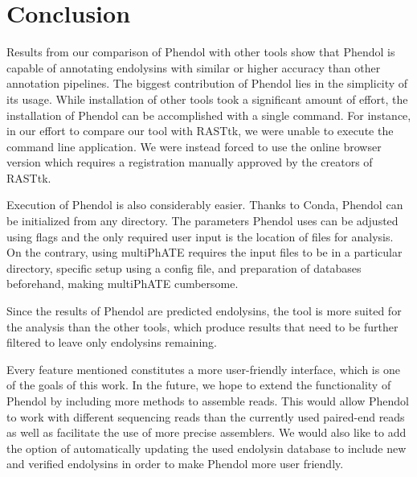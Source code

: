 \chapter*{Conclusion}  %

Results from our comparison of Phendol with other tools show that Phendol is capable of annotating endolysins with similar or higher accuracy than other annotation pipelines. The biggest contribution of Phendol lies in the simplicity of its usage. While installation of other tools took a significant amount of effort, the installation of Phendol can be accomplished with a single command. For instance, in our effort to compare our tool with RASTtk, we were unable to execute the command line application. We were instead forced to use the online browser version which requires a registration manually approved by the creators of RASTtk. 

Execution of Phendol is also considerably easier. Thanks to Conda, Phendol can be initialized from any directory. The parameters Phendol uses can be adjusted using flags and the only required user input is the location of files for analysis. On the contrary, using multiPhATE requires the input files to be in a particular directory, specific setup using a config file, and preparation of databases beforehand, making multiPhATE cumbersome. 

Since the results of Phendol are predicted endolysins, the tool is more suited for the analysis than the other tools, which produce results that need to be further filtered to leave only endolysins remaining.

Every feature mentioned constitutes a more user-friendly interface, which is one of the goals of this work. In the future, we hope to extend the functionality of Phendol by including more methods to assemble reads. This would allow Phendol to work with different sequencing reads than the currently used paired-end reads as well as facilitate the use of more precise assemblers. We would also like to add the option of automatically updating the used endolysin database to include new and verified endolysins in order to make Phendol more user friendly.